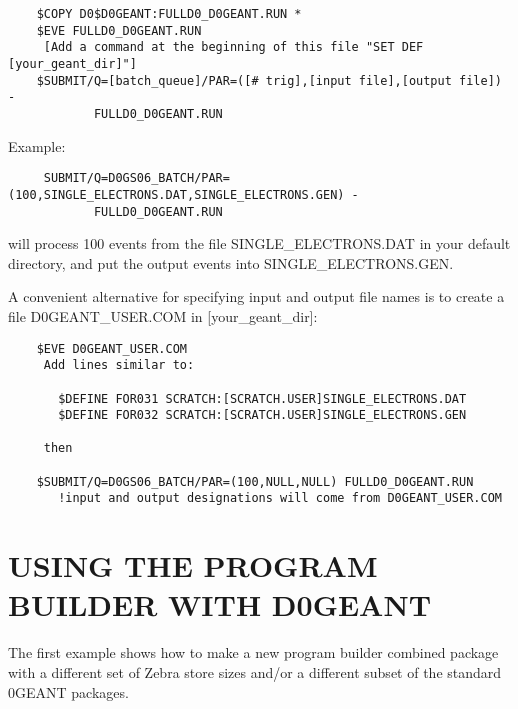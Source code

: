 \begin{verbatim}
    $COPY D0$D0GEANT:FULLD0_D0GEANT.RUN *
    $EVE FULLD0_D0GEANT.RUN
     [Add a command at the beginning of this file "SET DEF [your_geant_dir]"]
    $SUBMIT/Q=[batch_queue]/PAR=([# trig],[input file],[output file]) -
            FULLD0_D0GEANT.RUN
\end{verbatim}

    Example:

\begin{verbatim}
     SUBMIT/Q=D0GS06_BATCH/PAR=(100,SINGLE_ELECTRONS.DAT,SINGLE_ELECTRONS.GEN) -
            FULLD0_D0GEANT.RUN
\end{verbatim}
will process 100 events from the file SINGLE\_ELECTRONS.DAT in your
default directory, and put the output events into SINGLE\_ELECTRONS.GEN.

A convenient alternative for specifying input and output file names is
to create a file D0GEANT\_USER.COM in [your\_geant\_dir]:

\begin{verbatim}
    $EVE D0GEANT_USER.COM
     Add lines similar to:

       $DEFINE FOR031 SCRATCH:[SCRATCH.USER]SINGLE_ELECTRONS.DAT
       $DEFINE FOR032 SCRATCH:[SCRATCH.USER]SINGLE_ELECTRONS.GEN

     then

    $SUBMIT/Q=D0GS06_BATCH/PAR=(100,NULL,NULL) FULLD0_D0GEANT.RUN
       !input and output designations will come from D0GEANT_USER.COM
\end{verbatim}

\section{USING THE PROGRAM BUILDER WITH D0GEANT}
\label{pbd}

The first example shows how to make a new program builder combined package
with a different set of Zebra store sizes and/or a different subset of
the standard \D0GEANT packages.

